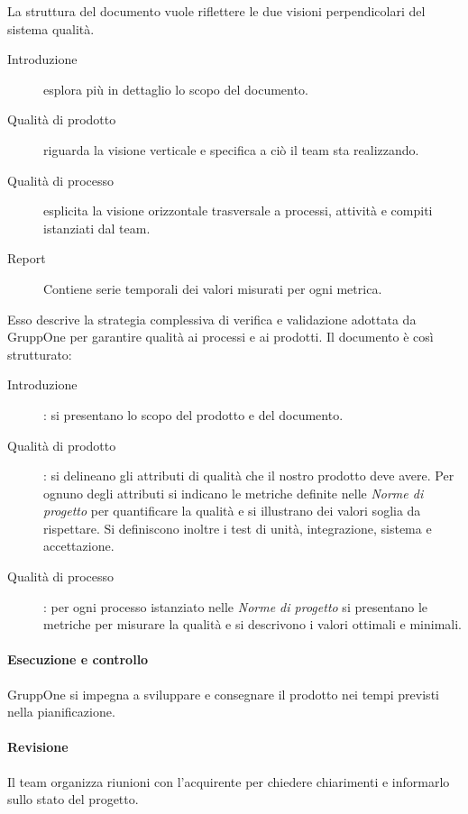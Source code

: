 \documentclass[../../norme-di-progetto.tex]{subfiles}
\begin{document}
La struttura del documento vuole riflettere le due visioni perpendicolari del sistema qualità.

\begin{description}
  \item [Introduzione] esplora più in dettaglio lo scopo del documento.
  \item [Qualità di prodotto] riguarda la visione verticale e specifica a ciò il team sta realizzando.
  \item [Qualità di processo] esplicita la visione orizzontale trasversale a processi, attività e compiti istanziati dal team.
  \item [Report] Contiene serie temporali dei valori misurati per ogni metrica.
\end{description}

Esso descrive la strategia complessiva di verifica e validazione adottata da GruppOne per garantire qualità ai processi e ai prodotti. Il documento è così strutturato:
\begin{description}
  \item [Introduzione]: si presentano lo scopo del prodotto e del documento.
  \item [Qualità di prodotto]: si delineano gli attributi di qualità che il nostro prodotto deve avere. Per ognuno degli attributi si indicano le metriche definite nelle \textit{Norme di progetto} per quantificare la qualità e si illustrano dei valori soglia da rispettare. Si definiscono inoltre i test di unità, integrazione, sistema e accettazione.
  \item [Qualità di processo]: per ogni processo istanziato nelle \textit{Norme di progetto} si presentano le metriche per misurare la qualità e si descrivono i valori ottimali e minimali.
\end{description}

\paragraph{Esecuzione e controllo}%
\label{par:esecuzione e controllo}

GruppOne si impegna a sviluppare e consegnare il prodotto nei tempi previsti nella pianificazione.

\paragraph{Revisione}%
\label{par:revisione}

Il team organizza riunioni con l'acquirente per chiedere chiarimenti e informarlo sullo stato del progetto.
\end{document}

